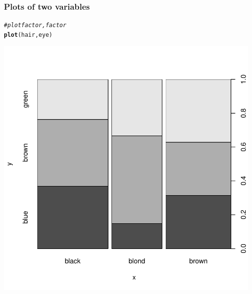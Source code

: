 \documentclass[12pt]{beamer}\usepackage[]{graphicx}\usepackage[]{color}
\makeatletter
\newcommand{\hlcom}[1]{\textcolor[rgb]{0.678,0.584,0.686}{\textit{#1}}}%
\newcommand{\hlstd}[1]{\textcolor[rgb]{0.345,0.345,0.345}{#1}}%
\newcommand{\hlkwd}[1]{\textcolor[rgb]{0.737,0.353,0.396}{\textbf{#1}}}%
\newenvironment{kframe}{%
 \def\at@end@of@kframe{}%
 \ifinner\ifhmode%
  \def\at@end@of@kframe{\end{minipage}}%
  \begin{minipage}{\columnwidth}%
 \fi\fi%
 \def\FrameCommand##1{\hskip\@totalleftmargin \hskip-\fboxsep
 \colorbox{shadecolor}{##1}\hskip-\fboxsep
     \hskip-\linewidth \hskip-\@totalleftmargin \hskip\columnwidth}%
 \MakeFramed {\advance\hsize-\width
   \@totalleftmargin\z@ \linewidth\hsize
   \@setminipage}}%
 {\par\unskip\endMakeFramed%
 \at@end@of@kframe}
\newenvironment{knitrout}{}{} %
\makeatother
\begin{document}

\begin{frame}[fragile]
\frametitle{Plots of two variables}
\begin{knitrout}\footnotesize
{}\color{fgcolor}\begin{kframe}
\begin{alltt}
\hlcom{# plot factor, factor}
\hlkwd{plot}\hlstd{(hair, eye)}
\end{alltt}
\end{kframe}

{\centering \includegraphics[width=.7\linewidth,height=.6\linewidth]{figure/unnamed-chunk-11-1} 

}



\end{knitrout}
\end{frame}

\end{document}
